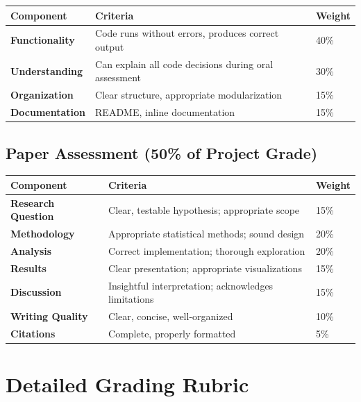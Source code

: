 \documentclass[10pt,letterpaper]{article}
\begin{document}
\begin{center}
\small
\renewcommand{\arraystretch}{1.18}
\begin{tabularx}{\textwidth}{>{\bfseries}p{2.6cm}Xp{1.3cm}}
\toprule
\rowcolor{accentblue!10}
Component & Criteria & Weight\\
\midrule
Functionality & Code runs without errors, produces correct output & 40\%\\
Understanding & Can explain all code decisions during oral assessment & 30\%\\
Organization & Clear structure, appropriate modularization & 15\%\\
Documentation & README, inline documentation & 15\%\\
\bottomrule
\end{tabularx}
\end{center}

\subsection{Paper Assessment (50\% of Project Grade)}

\begin{center}
\small
\renewcommand{\arraystretch}{1.18}
\begin{tabularx}{\textwidth}{>{\bfseries}p{2.6cm}Xp{1.3cm}}
\toprule
\rowcolor{accentblue!10}
Component & Criteria & Weight\\
\midrule
Research Question & Clear, testable hypothesis; appropriate scope & 15\%\\
Methodology & Appropriate statistical methods; sound design & 20\%\\
Analysis & Correct implementation; thorough exploration & 20\%\\
Results & Clear presentation; appropriate visualizations & 15\%\\
Discussion & Insightful interpretation; acknowledges limitations & 15\%\\
Writing Quality & Clear, concise, well-organized & 10\%\\
Citations & Complete, properly formatted & 5\%\\
\bottomrule
\end{tabularx}
\end{center}

\section{Detailed Grading Rubric}
\end{document}
